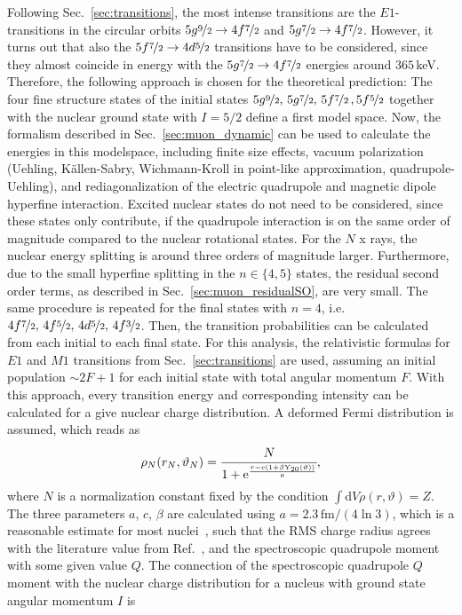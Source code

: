 Following Sec.~\ref{sec:transitions}, the most intense transitions are the $E1$-transitions in the circular orbits $5g\nicefrac{9}{2}\rightarrow4f\nicefrac{7}{2}$ and $5g\nicefrac{7}{2}\rightarrow4f\nicefrac{7}{2}$. However, it turns out that also the $5f\nicefrac{7}{2}\rightarrow4d\nicefrac{5}{2}$ transitions have to be considered, since they almost coincide in energy with the $5g\nicefrac{7}{2}\rightarrow4f\nicefrac{7}{2}$ energies around $365\,$keV. Therefore, the following approach is chosen for the theoretical prediction: The four fine structure states of the initial states $5g\nicefrac{9}{2},\,5g\nicefrac{7}{2},\,5f\nicefrac{7}{2}\,,5f\nicefrac{5}{2}$ together with the nuclear ground state with $I=5/2$ define a first model space. Now, the formalism described in Sec.~\ref{sec:muon_dynamic} can be used to calculate the energies in this modelspace, including finite size effects, vacuum polarization (Uehling, Källen-Sabry, Wichmann-Kroll in point-like approximation, quadrupole-Uehling), and rediagonalization of the electric quadrupole and magnetic dipole hyperfine interaction.
Excited nuclear states do not need to be considered, since these states only contribute, if the quadrupole interaction is on the same order of magnitude compared to the nuclear rotational states. For the $N$ x rays, the nuclear energy splitting is around three orders of magnitude larger. Furthermore, due to the small hyperfine splitting in the ${n}{\in}{\{4,5\}}$ states, the residual second order terms, as described in Sec.~\ref{sec:muon_residualSO}, are very small.
The same procedure is repeated for the final states with ${n}{=}{4}$, i.e. $4f\nicefrac{7}{2},\,4f\nicefrac{5}{2},\,4d\nicefrac{5}{2},\,4f\nicefrac{3}{2}$. Then, the transition probabilities can be calculated from each initial to each final state. For this analysis, the relativistic formulas for $E1$ and $M1$ transitions from Sec.~\ref{sec:transitions} are used, assuming an initial population $\sim 2F+1$ for each initial state with total angular momentum $F$. With this approach, every transition energy and corresponding intensity can be calculated for a give nuclear charge distribution. A deformed Fermi distribution is assumed, which reads as
\begin{equation}
\rho_N(r_N,\vartheta_N)=\cfrac{N}{1+\text{e}^{\frac{r-c(1+\beta \text{Y}_{20}(\vartheta))}{a}}},
\end{equation}
where $N$ is a normalization constant fixed by the condition $\int\text{d}V \rho(r,\vartheta) = Z$.
The three parameters $a$, $c$, $\beta$ are calculated using $a=2.3\,\text{fm}/(4\ln3)$, which is a reasonable estimate for most nuclei~\cite{Beier2000}, such that the RMS charge radius agrees with the literature value from Ref.~\cite{Angeli2013}, and the spectroscopic quadrupole moment with some given value $Q$. The connection of the spectroscopic quadrupole $Q$ moment with the nuclear charge distribution for a nucleus with ground state angular momentum $I$ is
